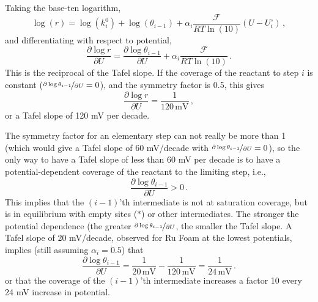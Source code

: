 
Taking the base-ten logarithm, 
\begin{equation}
\log(r) = \log(k^0_i) + \log(\theta_{i-1}) + \alpha_i\frac{\mathcal{F}}{RT\ln(10)}(U-U^\circ_i)\,,
\end{equation}
and differentiating with respect to potential,
\begin{equation}
\frac{\partial \log{r}}{\partial U} = \frac{\partial \log{\theta_{i-1}}}{\partial U} + \alpha_i\frac{\mathcal{F}}{RT\ln(10)}\,.
\end{equation}
This is the reciprocal of the Tafel slope. If the coverage of the reactant to step $i$ is constant ($\nicefrac{\partial \log{\theta_{i-1}}}{\partial U} = 0$), and the symmetry factor is 0.5, this gives 
\begin{equation}
\frac{\partial \log{r}}{\partial U} = \frac{1}{120\,\text{mV}}\,,
\end{equation}
or a Tafel slope of 120 mV per decade. 

The symmetry factor for an elementary step can not really be more than 1 (which would give a Tafel slope of 60 mV/decade with $\nicefrac{\partial \log{\theta_{i-1}}}{\partial U} = 0$), so the only way to have a Tafel slope of less than 60 mV per decade is to have a potential-dependent coverage of the reactant to the limiting step, i.e., 
\begin{equation}
\frac{\partial \log{\theta_{i-1}}}{\partial U} > 0\,.
\end{equation}
This implies that the $(i-1)$'th intermediate is not at saturation coverage, but is in equilibrium with empty sites ($*$) or other intermediates. The stronger the potential dependence (the greater $\nicefrac{\partial \log{\theta_{i-1}}}{\partial U}$, the smaller the Tafel slope. A Tafel slope of 20 mV/decade, observed for Ru Foam at the lowest potentials, implies (still assuming $\alpha_i=0.5$) that
\begin{equation}
\frac{\partial \log{\theta_{i-1}}}{\partial U} = \frac{1}{20\,\text{mV}} - \frac{1}{120\,\text{mV}} = \frac{1}{24\,\text{mV}}\,.
\end{equation}
or that the coverage of the $(i-1)$'th intermediate increases a factor 10 every 24 mV increase in potential.

